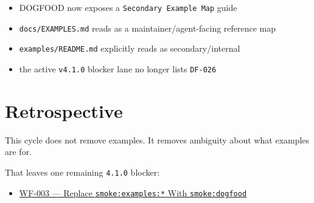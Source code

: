 \begin{itemize}
\tightlist
\item
  DOGFOOD now exposes a \texttt{S\allowbreak{}e\allowbreak{}c\allowbreak{}o\allowbreak{}n\allowbreak{}d\allowbreak{}a\allowbreak{}r\allowbreak{}y\allowbreak{} \allowbreak{}E\allowbreak{}x\allowbreak{}a\allowbreak{}m\allowbreak{}p\allowbreak{}l\allowbreak{}e\allowbreak{} \allowbreak{}M\allowbreak{}a\allowbreak{}p} guide
\item
  \texttt{d\allowbreak{}o\allowbreak{}c\allowbreak{}s\allowbreak{}/\allowbreak{}E\allowbreak{}X\allowbreak{}A\allowbreak{}M\allowbreak{}P\allowbreak{}L\allowbreak{}E\allowbreak{}S\allowbreak{}.\allowbreak{}m\allowbreak{}d} reads as a maintainer/agent-facing reference map
\item
  \texttt{e\allowbreak{}x\allowbreak{}a\allowbreak{}m\allowbreak{}p\allowbreak{}l\allowbreak{}e\allowbreak{}s\allowbreak{}/\allowbreak{}R\allowbreak{}E\allowbreak{}A\allowbreak{}D\allowbreak{}M\allowbreak{}E\allowbreak{}.\allowbreak{}m\allowbreak{}d} explicitly reads as secondary/internal
\item
  the active \texttt{v\allowbreak{}4\allowbreak{}.\allowbreak{}1\allowbreak{}.\allowbreak{}0} blocker lane no longer lists \texttt{D\allowbreak{}F\allowbreak{}-\allowbreak{}0\allowbreak{}2\allowbreak{}6}
\end{itemize}

\section{Retrospective}\label{record-087-retrospective}

This cycle does not remove examples. It removes ambiguity about what examples are for.

That leaves one remaining \texttt{4\allowbreak{}.\allowbreak{}1\allowbreak{}.\allowbreak{}0} blocker:

\begin{itemize}
\tightlist
\item
  \href{https://github.com/flyingrobots/bijou/blob/cbd70612140e7a450d764b3c7be1c6af878b99bc/docs/design/WF-003-replace-smoke-examples-with-smoke-dogfood.md}{WF-003 --- Replace \texttt{s\allowbreak{}m\allowbreak{}o\allowbreak{}k\allowbreak{}e\allowbreak{}:\allowbreak{}e\allowbreak{}x\allowbreak{}a\allowbreak{}m\allowbreak{}p\allowbreak{}l\allowbreak{}e\allowbreak{}s\allowbreak{}:\allowbreak{}*} With \texttt{s\allowbreak{}m\allowbreak{}o\allowbreak{}k\allowbreak{}e\allowbreak{}:\allowbreak{}d\allowbreak{}o\allowbreak{}g\allowbreak{}f\allowbreak{}o\allowbreak{}o\allowbreak{}d}}
\end{itemize}

